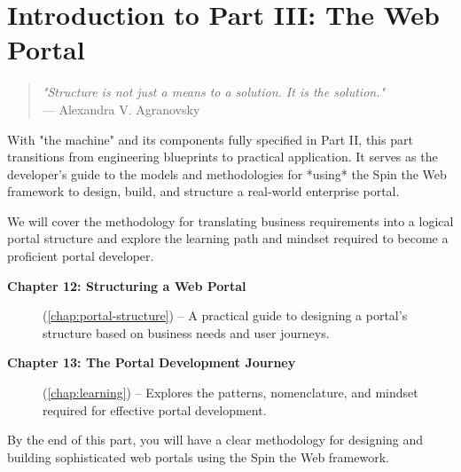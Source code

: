 
\chapter*{Introduction to Part III: The Web Portal}
\label{part:implementation}

\begin{quote}
\textit{"Structure is not just a means to a solution. It is the solution."} \\
— Alexandra V. Agranovsky
\end{quote}

With "the machine" and its components fully specified in Part II, this part transitions from engineering blueprints to practical application. It serves as the developer's guide to the models and methodologies for *using* the Spin the Web framework to design, build, and structure a real-world enterprise portal.

We will cover the methodology for translating business requirements into a logical portal structure and explore the learning path and mindset required to become a proficient portal developer.
\begin{description}
\item[\textbf{Chapter 12: Structuring a Web Portal}] (\cref{chap:portal-structure}) -- A practical guide to designing a portal's structure based on business needs and user journeys.

\item[\textbf{Chapter 13: The Portal Development Journey}] (\cref{chap:learning}) -- Explores the patterns, nomenclature, and mindset required for effective portal development.
\end{description}

By the end of this part, you will have a clear methodology for designing and building sophisticated web portals using the Spin the Web framework.

